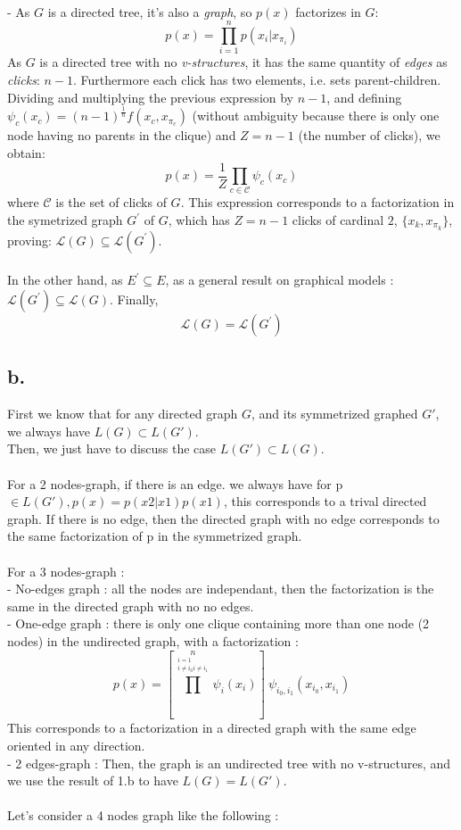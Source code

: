 \documentclass[12pt]{article}
\begin{document}
~\\
- As $G$ is a directed tree, it's also a \emph{graph}, so $p(x)$ factorizes in $G$:
$$p(x) = \prod^n_{i=1}p(x_i|x_{\pi_i})$$
As $G$ is a directed tree with no \emph{v-structures}, it has the same quantity of \emph{edges} as \emph{clicks}: $n-1$. Furthermore each click has two elements, i.e. sets parent-children. Dividing and multiplying the previous expression by $n-1$, and defining $\psi_{c}(x_{c}) = (n-1)^{\frac{1}{n}}f(x_c,x_{\pi_c})$ (without ambiguity because there is only one node having no parents in the clique) and $Z=n-1$ (the number of clicks), we obtain:
$$p(x) = \frac{1}{Z}\prod_{c\in \mathcal{C}}\psi_c(x_c)$$
where $\mathcal{C}$ is the set of clicks of $G$. This expression corresponds to a factorization in the symetrized graph $G^\prime$ of $G$, which has $Z=n-1$ clicks of cardinal $2$, $\{x_k, x_{\pi_k}\}$, proving: $\mathcal{L}(G)\subseteq \mathcal{L}(G^\prime)$.
~\\
~\\
In the other hand, as $E^\prime \subseteq E$, as a general result on graphical models : $\mathcal{L}(G^\prime)\subseteq \mathcal{L}(G)$.
Finally, $$\boxed{\mathcal{L}(G) = \mathcal{L}(G^\prime)}$$

\subsection*{b.}
First we know that for any directed graph $G$, and its symmetrized graphed $G'$, we always have $L(G)\subset L(G')$.~\\
Then, we just have to discuss the case $L(G') \subset  L(G)$.~\\
~\\
For a 2 nodes-graph, if there is an edge. we always have for p $\in L(G'), p(x)=p(x2|x1)p(x1)$, this corresponds to a trival directed graph. If there is no edge, then the directed graph with no edge corresponds to the same factorization of p in the symmetrized graph.~\\
~\\
For a 3 nodes-graph :~\\
- No-edges graph : all the nodes are independant, then the factorization is the same in the directed graph with no no edges.~\\
- One-edge graph : there is only one clique containing more than one node (2 nodes)  in the undirected graph, with a factorization :~\\
$$p(x) = [\prod^n \limits_{\substack{i=1 \\ i \neq i_{0} i \neq {i_{1}} } }\psi_{i}(x_i)] \: \psi_{i_{0},i_{1}}(x_{i_{0}},x_{i_{1}})$$
This corresponds to a factorization in a directed graph with the same edge oriented in any direction.~\\
- 2 edges-graph : Then, the graph is an undirected tree with no v-structures, and we use the result of 1.b to have $L(G)=L(G')$.~\\
~\\
Let's consider a 4 nodes graph like the following :~\\
\end{document}
